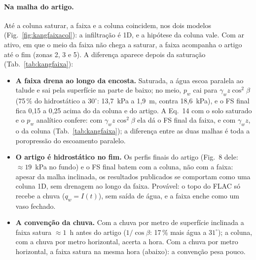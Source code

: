 \paragraph{Na malha do artigo.} Até a coluna saturar, a faixa e a coluna coincidem, nos dois modelos
(Fig.~\ref{fig:kangfaixacol}): a infiltração é 1D, e a hipótese da coluna vale. Com ar ativo, em que o meio da faixa
não chega a saturar, a faixa acompanha o artigo até o fim (zonas 2, 3 e 5). A diferença aparece depois da saturação
(Tab.~\ref{tab:kangfaixa}):
\begin{itemize}
  \item \textbf{A faixa drena ao longo da encosta.} Saturada, a água escoa paralela ao talude e sai pela superfície na
    parte de baixo; no meio, $p_w$ cai para $\gamma_w z\cos^2\beta$ (75\,\% do hidrostático a $30^\circ$: 13,7~kPa a
    1,9~m, contra 18,6~kPa), e o FS final fica 0,15 a 0,25 acima do da coluna e do artigo. A Eq.~14 com o solo saturado e o $p_w$
    analítico confere: com $\gamma_w z\cos^2\beta$ ela dá o FS final da faixa, e com $\gamma_w z$, o da coluna
    (Tab.~\ref{tab:kangfaixa}); a diferença entre as duas malhas é toda a poropressão do escoamento paralelo.
  \item \textbf{O artigo é hidrostático no fim.} Os perfis finais do artigo (Fig.~8 dele: $\approx 19$~kPa no fundo) e o
    FS final batem com a coluna, não com a faixa: apesar da malha inclinada, os resultados publicados se comportam como
    uma coluna 1D, sem drenagem ao longo da faixa. Provável: o topo do FLAC só recebe a chuva ($q_w = I(t)$), sem saída
    de água, e a faixa enche como um vaso fechado. 
  \item \textbf{A convenção da chuva.} Com a chuva por metro de superfície inclinada a faixa satura $\approx 1$~h antes
    do artigo ($1/\cos\beta$: 17\,\% mais água a $31^\circ$); a coluna, com a chuva por metro horizontal, acerta a hora.
    Com a chuva por metro horizontal, a faixa satura na mesma hora (abaixo): a convenção pesa pouco.
\end{itemize}
